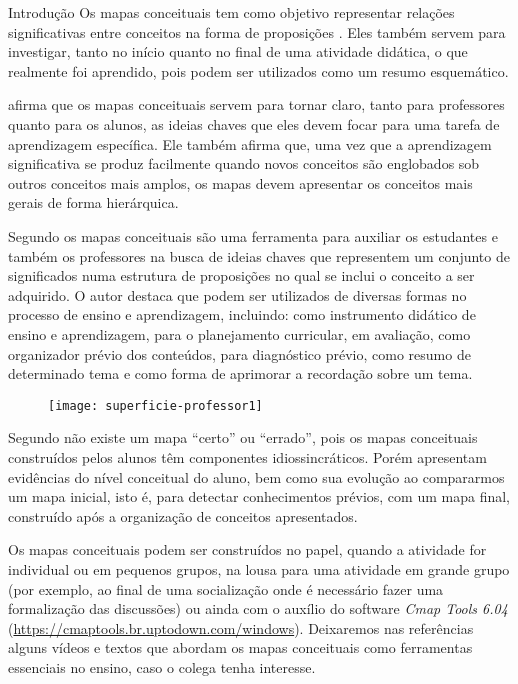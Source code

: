 \begin{apresentacao}{Introdução}
  Os mapas conceituais tem como objetivo representar relações significativas entre conceitos na forma de proposições \citep{novak1985}.  Eles também servem para investigar, tanto no início quanto no final de uma atividade didática, o que realmente foi aprendido, pois podem ser utilizados como um resumo esquemático.

  \citet{novak1985} afirma que os mapas conceituais servem para tornar claro, tanto para professores quanto para os alunos, as ideias chaves que eles devem focar para uma tarefa de aprendizagem específica. Ele também afirma que, uma vez que a aprendizagem significativa se produz facilmente quando novos conceitos são englobados sob outros conceitos mais amplos, os mapas devem apresentar os conceitos mais gerais de forma hierárquica.

  Segundo \citet{ribeiro2015} os mapas conceituais são uma ferramenta para auxiliar { }os estudantes e também os professores na busca de ideias chaves que representem um conjunto de significados numa estrutura de proposições no qual se inclui o conceito a ser adquirido.  O autor destaca que podem ser utilizados de diversas formas no processo de ensino e aprendizagem, incluindo: como instrumento didático de ensino e aprendizagem, para o planejamento curricular, em avaliação, como organizador prévio dos conteúdos, para diagnóstico prévio, como resumo de determinado tema e como forma de aprimorar a recordação sobre um tema.

  \begin{figure}[H]
  \centering
  
  \texttt{[image: superficie-professor1]}
  \end{figure}
  \columnbreak

  Segundo \citet{moreira2011} não existe um mapa “certo” ou “errado”, pois os mapas conceituais construídos pelos alunos têm componentes idiossincráticos. Porém apresentam evidências do nível conceitual do aluno, bem como sua evolução ao compararmos um mapa inicial, isto é, para detectar conhecimentos prévios, com um mapa final, construído após a organização de conceitos apresentados.

  Os mapas conceituais podem ser construídos no papel, quando a atividade for individual ou em pequenos grupos, na lousa para uma atividade em grande grupo (por exemplo, ao final de uma socialização onde é necessário fazer uma formalização das discussões) ou ainda com o auxílio do software \textit{Cmap Tools 6.04} (\url{https://cmaptools.br.uptodown.com/windows}). Deixaremos nas referências alguns vídeos e textos que abordam os mapas conceituais como ferramentas essenciais no ensino, caso o colega tenha interesse.


\end{apresentacao}
